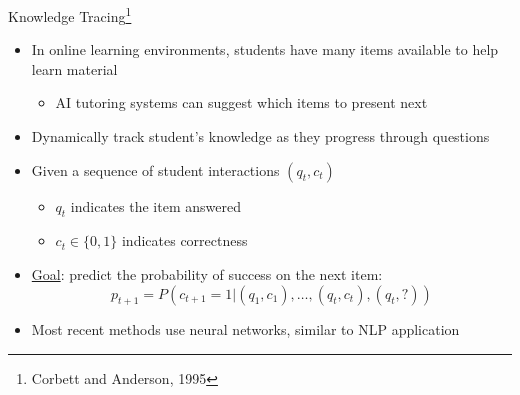 \documentclass{beamer}
\theoremstyle{definition}
\begin{document}

\begin{frame}{Knowledge Tracing\footnote{Corbett and Anderson, 1995}}
  \begin{itemize}
    \item In online learning environments, students have many items available to help learn material
      \begin{itemize}
        \item AI tutoring systems can suggest which items to present next
      \end{itemize}
    \item Dynamically track student's knowledge as they progress through questions
    \item<2-> Given a sequence of student interactions $(q_t, c_t)$
      \begin{itemize}
        \item $q_t$ indicates the item answered
        \item $c_t \in \{0,1\}$ indicates correctness
      \end{itemize}
    \item<3-> \underline{Goal}: predict the probability of success on the next item:
      \[p_{t+1} = P(c_{t+1} = 1 | (q_1, c_1),\ldots, (q_t, c_t), (q_t, ?))\]
    \item<4-> Most recent methods use neural networks, similar to NLP application
  \end{itemize}
\end{frame}
\end{document}
